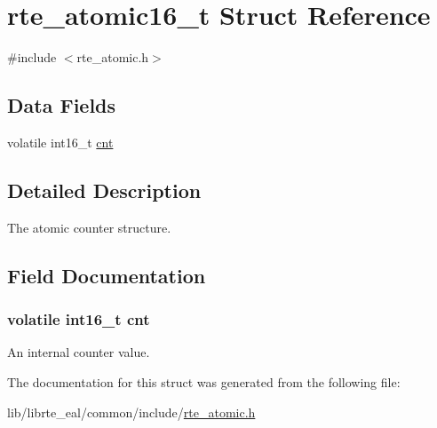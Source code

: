 \hypertarget{structrte__atomic16__t}{}\section{rte\+\_\+atomic16\+\_\+t Struct Reference}
\label{structrte__atomic16__t}


{\ttfamily \#include $<$rte\+\_\+atomic.\+h$>$}

\subsection*{Data Fields}
\begin{DoxyCompactItemize}
\item 
volatile int16\+\_\+t \hyperlink{structrte__atomic16__t_ac49bf99f3d13a7fef5b2bd4337fac3d1}{cnt}
\end{DoxyCompactItemize}


\subsection{Detailed Description}
The atomic counter structure. 

\subsection{Field Documentation}
\hypertarget{structrte__atomic16__t_ac49bf99f3d13a7fef5b2bd4337fac3d1}{}
\subsubsection[{cnt}]{\setlength{\rightskip}{0pt plus 5cm}volatile int16\+\_\+t cnt}\label{structrte__atomic16__t_ac49bf99f3d13a7fef5b2bd4337fac3d1}
An internal counter value. 

The documentation for this struct was generated from the following file\+:\begin{DoxyCompactItemize}
\item 
lib/librte\+\_\+eal/common/include/\hyperlink{rte__atomic_8h}{rte\+\_\+atomic.\+h}\end{DoxyCompactItemize}
